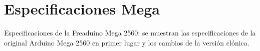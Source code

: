 
\chapter{Especificaciones Mega} %

\label{app:mega-specs} %

Especificaciones de la Freaduino Mega 2560: se muestran las especificaciones de la original Arduino Mega 2560 en primer lugar y los cambios de la versión clónica.

\newpage


